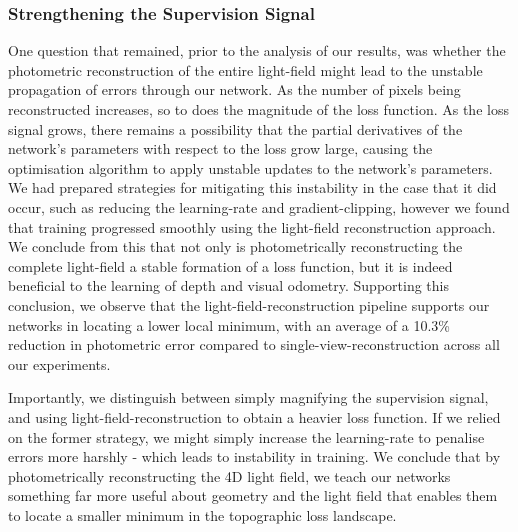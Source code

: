\subsubsection{Strengthening the Supervision Signal}
One question that remained, prior to the analysis of our results, was whether the photometric reconstruction of the entire light-field might lead to the unstable propagation of errors through our network. As the number of pixels being reconstructed increases, so to does the magnitude of the loss function. As the loss signal grows, there remains a possibility that the partial derivatives of the network's parameters with respect to the loss grow large, causing the optimisation algorithm to apply unstable updates to the network's parameters. We had prepared strategies for mitigating this instability in the case that it did occur, such as reducing the learning-rate and gradient-clipping, however we found that training progressed smoothly using the light-field reconstruction approach. We conclude from this that not only is photometrically reconstructing the complete light-field a stable formation of a loss function, but it is indeed beneficial to the learning of depth and visual odometry. Supporting this conclusion, we observe that the light-field-reconstruction pipeline supports our networks in locating a lower local minimum, with an average of a 10.3\% reduction in photometric error compared to single-view-reconstruction across all our experiments. 

Importantly, we distinguish between simply magnifying the supervision signal, and using light-field-reconstruction to obtain a heavier loss function. If we relied on the former strategy, we might simply increase the learning-rate to penalise errors more harshly - which leads to instability in training. We conclude that by photometrically reconstructing the 4D light field, we teach our networks something far more useful about geometry and the light field that enables them to locate a smaller minimum in the topographic loss landscape.

